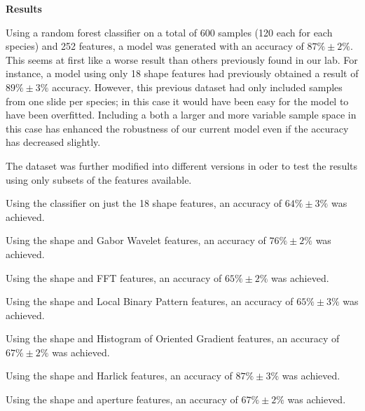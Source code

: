 \textbf{Results}

Using a random forest classifier on a total of 600 samples (120 each for each species) and 252 features, a model was generated with an accuracy of $87\% \pm 2\%$. This seems at first like a worse result than others previously found in our lab. For instance, a model using only 18 shape features had previously obtained a result of $89\% \pm 3\%$ accuracy. However, this previous dataset had only included samples from one slide per species; in this case it would have been easy for the model to have been overfitted. Including a both a larger and more variable sample space in this case has enhanced the robustness of our current model even if the accuracy has decreased slightly.

The dataset was further modified into different versions in oder to test the results using only subsets of the features available.

Using the classifier on just the 18 shape features, an accuracy of  $64\% \pm 3\%$ was achieved.

Using the shape and Gabor Wavelet features, an accuracy of $76\% \pm 2\%$ was achieved.

Using the shape and FFT features, an accuracy of $65\% \pm 2\%$ was achieved.

Using the shape and Local Binary Pattern features, an accuracy of $65\% \pm 3\%$ was achieved.

Using the shape and Histogram of Oriented Gradient features, an accuracy of $67\% \pm 2\%$ was achieved.

Using the shape and Harlick features, an accuracy of $87\% \pm 3\%$ was achieved.

Using the shape and aperture features, an accuracy of $67\% \pm 2\%$ was achieved.

  
  
